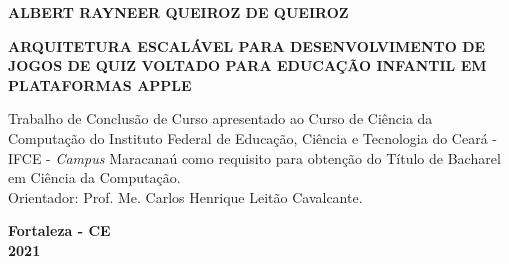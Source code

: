 \begin{titlepage}

\begin{center}
\textbf{ALBERT RAYNEER QUEIROZ DE QUEIROZ\\}
\vspace{7,5cm}

		\textbf{ARQUITETURA ESCALÁVEL PARA DESENVOLVIMENTO DE JOGOS DE QUIZ VOLTADO PARA EDUCAÇÃO INFANTIL EM PLATAFORMAS APPLE}\\

\vspace{2.5cm}

\vspace{2cm}
\begin{flushright}
	\begin{minipage}[l]{8cm}
		Trabalho de Conclusão de Curso apresentado ao Curso de Ciência da Computação do Instituto Federal de Educação, Ciência e Tecnologia do Ceará -IFCE - {\it{Campus}} Maracanaú como requisito para obtenção do Título de Bacharel em Ciência da Computação.\\
		Orientador: Prof. Me. Carlos Henrique Leitão Cavalcante.
	\end{minipage}
\end{flushright}

\end{center}

\vfill
\centering
		
			\textbf{Fortaleza - CE \\2021}

\end{titlepage}




